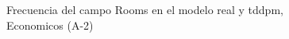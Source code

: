 \begin{figure}[H]
    \centering
    
    \caption{Frecuencia del campo Rooms en el modelo real y tddpm, Economicos (A-2)}
    \label{frecuency-Rooms-tddpm_mlp}
\end{figure}